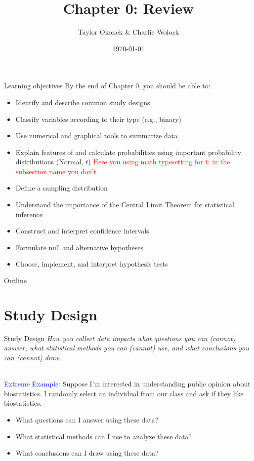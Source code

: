 \documentclass[10pt,t]{beamer}
\title{Chapter 0: Review}
\author{Taylor Okonek \& Charlie Wolock}
\date{\today}
\begin{document}
	\begin{frame}
	\titlepage 
\end{frame}

\begin{frame}{Learning objectives}
By the end of Chapter 0, you should be able to:
\begin{itemize}
	\item Identify and describe common study designs
	\item Classify variables according to their type (e.g., binary)
	\item Use numerical and graphical tools to summarize data
	\item Explain features of and calculate probabilities using important probability distributions (Normal, $t$) \textcolor{red}{Here you using math typesetting for t; in the subsection name you don't}
	\item Define a sampling distribution
	\item Understand the importance of the Central Limit Theorem for statistical inference
	\item Construct and interpret confidence intervals
	\item Formulate null and alternative hypotheses
	\item Choose, implement, and interpret hypothesis tests
\end{itemize}
\end{frame}

\begin{frame}{Outline}
\tableofcontents
\end{frame}


\section{Study Design}

\begin{frame}{Study Design}
\textit{How you collect data impacts what questions you can (cannot) answer, what statistical methods you can (cannot) use, and what conclusions you can (cannot) draw.} \\~\

\textcolor{blue}{Extreme Example:} Suppose I'm interested in understanding public opinion about biostatistics. I randomly select an individual from our class and ask if they like biostatistics.

\begin{itemize}
	\item What questions can I answer using these data?
	\item What statistical methods can I use to analyze these data?
	\item What conclusions can I draw using these data?
\end{itemize}
\end{frame}
\end{document}

